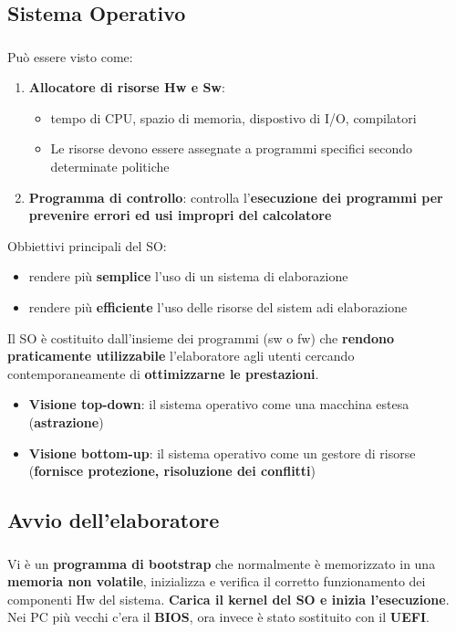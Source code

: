 \documentclass{beamer}
\newenvironment{mainframe}{
	\begin{frame}
		\frametitle{\insertsubsection}
		\framesubtitle{\insertsection}
	}{
	\end{frame}
}
\begin{document}
\subsection{Sistema Operativo}
\begin{mainframe}
	Può essere visto come:
	\begin{enumerate}
		\item \textbf{Allocatore di risorse Hw e Sw}:
		\begin{itemize}
			\item tempo di CPU, spazio di memoria, dispostivo di I/O, compilatori
			\item Le risorse devono essere assegnate a programmi specifici secondo determinate politiche
		\end{itemize}
		\item \textbf{Programma di controllo}: controlla l'\textbf{esecuzione dei programmi per prevenire errori ed usi impropri del calcolatore}
	\end{enumerate}
\end{mainframe}
\begin{frame}
	Obbiettivi principali del SO:
	\begin{itemize}
		\item rendere più \textbf{semplice} l'uso di un sistema di elaborazione
		\item rendere più \textbf{efficiente} l'uso delle risorse del sistem adi elaborazione
	\end{itemize}
	Il SO è costituito dall'insieme dei programmi (sw o fw) che \textbf{rendono praticamente utilizzabile} l'elaboratore agli utenti cercando contemporaneamente di \textbf{ottimizzarne le prestazioni}.
	\begin{itemize}
		\item \textbf{Visione top-down}: il sistema operativo come una macchina estesa (\textbf{astrazione})
		\item \textbf{Visione bottom-up}: il sistema operativo come un gestore di risorse (\textbf{fornisce protezione, risoluzione dei conflitti})
	\end{itemize}
\end{frame}
\subsection{Avvio dell'elaboratore}
\begin{mainframe}
	Vi è un \textbf{programma di bootstrap} che normalmente è memorizzato in una \textbf{memoria non volatile}, inizializza e verifica il corretto funzionamento dei componenti Hw del sistema. \textbf{Carica il kernel del SO e inizia l'esecuzione}.\\
	Nei PC più vecchi c'era il \textbf{BIOS}, ora invece è stato sostituito con il \textbf{UEFI}.
\end{mainframe}
\end{document}

